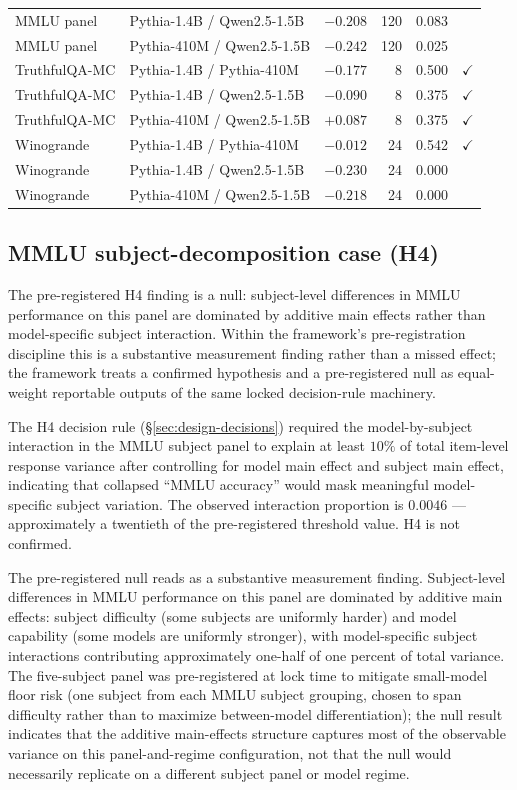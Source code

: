 \documentclass[11pt]{article}
\begin{document}
\begin{table}[h]
\begin{tabular}{llrrrc}
MMLU panel    & Pythia-1.4B / Qwen2.5-1.5B & $-0.208$ & 120 & 0.083 & \\
MMLU panel    & Pythia-410M / Qwen2.5-1.5B & $-0.242$ & 120 & 0.025 & \\
TruthfulQA-MC & Pythia-1.4B / Pythia-410M  & $-0.177$ & 8   & 0.500 & $\checkmark$ \\
TruthfulQA-MC & Pythia-1.4B / Qwen2.5-1.5B & $-0.090$ & 8   & 0.375 & $\checkmark$ \\
TruthfulQA-MC & Pythia-410M / Qwen2.5-1.5B & $+0.087$ & 8   & 0.375 & $\checkmark$ \\
Winogrande    & Pythia-1.4B / Pythia-410M  & $-0.012$ & 24  & 0.542 & $\checkmark$ \\
Winogrande    & Pythia-1.4B / Qwen2.5-1.5B & $-0.230$ & 24  & 0.000 & \\
Winogrande    & Pythia-410M / Qwen2.5-1.5B & $-0.218$ & 24  & 0.000 & \\
\bottomrule
\end{tabular}
\end{table}

\subsection{MMLU subject-decomposition case (H4)}
\label{sec:mmlu-subjects-results}

The pre-registered H4 finding is a null: subject-level differences in MMLU performance on this panel are dominated by additive main effects rather than model-specific subject interaction. Within the framework's pre-registration discipline this is a substantive measurement finding rather than a missed effect; the framework treats a confirmed hypothesis and a pre-registered null as equal-weight reportable outputs of the same locked decision-rule machinery.

The H4 decision rule (§\ref{sec:design-decisions}) required the model-by-subject interaction in the MMLU subject panel to explain at least $10\%$ of total item-level response variance after controlling for model main effect and subject main effect, indicating that collapsed ``MMLU accuracy'' would mask meaningful model-specific subject variation. The observed interaction proportion is $0.0046$ --- approximately a twentieth of the pre-registered threshold value. H4 is not confirmed.

The pre-registered null reads as a substantive measurement finding. Subject-level differences in MMLU performance on this panel are dominated by additive main effects: subject difficulty (some subjects are uniformly harder) and model capability (some models are uniformly stronger), with model-specific subject interactions contributing approximately one-half of one percent of total variance. The five-subject panel was pre-registered at lock time to mitigate small-model floor risk (one subject from each MMLU subject grouping, chosen to span difficulty rather than to maximize between-model differentiation); the null result indicates that the additive main-effects structure captures most of the observable variance on this panel-and-regime configuration, not that the null would necessarily replicate on a different subject panel or model regime.
\end{document}
